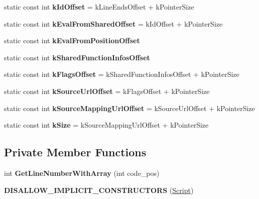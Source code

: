 \begin{DoxyCompactItemize}
\item 
static const int {\bfseries k\+Id\+Offset} = k\+Line\+Ends\+Offset + k\+Pointer\+Size\hypertarget{classv8_1_1internal_1_1_script_aee4b2225f5e2ec14f122c6d06d0f1c51}{}\label{classv8_1_1internal_1_1_script_aee4b2225f5e2ec14f122c6d06d0f1c51}

\item 
static const int {\bfseries k\+Eval\+From\+Shared\+Offset} = k\+Id\+Offset + k\+Pointer\+Size\hypertarget{classv8_1_1internal_1_1_script_ad65ac113056769cff3093fede56c5c34}{}\label{classv8_1_1internal_1_1_script_ad65ac113056769cff3093fede56c5c34}

\item 
static const int {\bfseries k\+Eval\+From\+Position\+Offset}
\item 
static const int {\bfseries k\+Shared\+Function\+Infos\+Offset}
\item 
static const int {\bfseries k\+Flags\+Offset} = k\+Shared\+Function\+Infos\+Offset + k\+Pointer\+Size\hypertarget{classv8_1_1internal_1_1_script_a885bc782f8dc8c358d4aae4a72b97e9b}{}\label{classv8_1_1internal_1_1_script_a885bc782f8dc8c358d4aae4a72b97e9b}

\item 
static const int {\bfseries k\+Source\+Url\+Offset} = k\+Flags\+Offset + k\+Pointer\+Size\hypertarget{classv8_1_1internal_1_1_script_a7568c12789b46731e2189037d7b41841}{}\label{classv8_1_1internal_1_1_script_a7568c12789b46731e2189037d7b41841}

\item 
static const int {\bfseries k\+Source\+Mapping\+Url\+Offset} = k\+Source\+Url\+Offset + k\+Pointer\+Size\hypertarget{classv8_1_1internal_1_1_script_a23d5b6efceed60bc940db2870f4d8ebd}{}\label{classv8_1_1internal_1_1_script_a23d5b6efceed60bc940db2870f4d8ebd}

\item 
static const int {\bfseries k\+Size} = k\+Source\+Mapping\+Url\+Offset + k\+Pointer\+Size\hypertarget{classv8_1_1internal_1_1_script_a80d31769a7f5c7901ff3a9534b4fcae3}{}\label{classv8_1_1internal_1_1_script_a80d31769a7f5c7901ff3a9534b4fcae3}

\end{DoxyCompactItemize}
\subsection*{Private Member Functions}
\begin{DoxyCompactItemize}
\item 
int {\bfseries Get\+Line\+Number\+With\+Array} (int code\+\_\+pos)\hypertarget{classv8_1_1internal_1_1_script_a5d1058e6d16b5943ad1913140b82e00a}{}\label{classv8_1_1internal_1_1_script_a5d1058e6d16b5943ad1913140b82e00a}

\item 
{\bfseries D\+I\+S\+A\+L\+L\+O\+W\+\_\+\+I\+M\+P\+L\+I\+C\+I\+T\+\_\+\+C\+O\+N\+S\+T\+R\+U\+C\+T\+O\+RS} (\hyperlink{classv8_1_1internal_1_1_script}{Script})\hypertarget{classv8_1_1internal_1_1_script_aca6b294569fc0ccce208a98f8e3296e1}{}\label{classv8_1_1internal_1_1_script_aca6b294569fc0ccce208a98f8e3296e1}

\end{DoxyCompactItemize}
